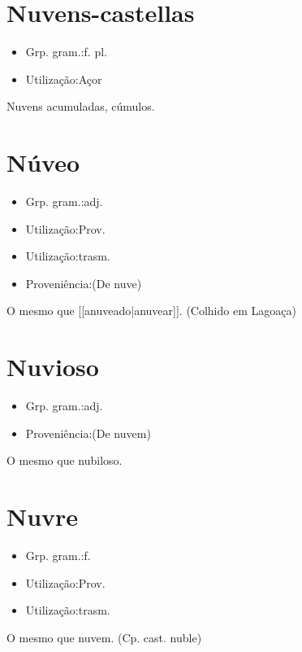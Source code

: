 \section{Nuvens-castellas}
\begin{itemize}
\item {Grp. gram.:f. pl.}
\end{itemize}
\begin{itemize}
\item {Utilização:Açor}
\end{itemize}
Nuvens acumuladas, cúmulos.
\section{Núveo}
\begin{itemize}
\item {Grp. gram.:adj.}
\end{itemize}
\begin{itemize}
\item {Utilização:Prov.}
\end{itemize}
\begin{itemize}
\item {Utilização:trasm.}
\end{itemize}
\begin{itemize}
\item {Proveniência:(De \textunderscore nuve\textunderscore )}
\end{itemize}
O mesmo que [[anuveado|anuvear]]. (Colhido em Lagoaça)
\section{Nuvioso}
\begin{itemize}
\item {Grp. gram.:adj.}
\end{itemize}
\begin{itemize}
\item {Proveniência:(De \textunderscore nuvem\textunderscore )}
\end{itemize}
O mesmo que \textunderscore nubiloso\textunderscore .
\section{Nuvre}
\begin{itemize}
\item {Grp. gram.:f.}
\end{itemize}
\begin{itemize}
\item {Utilização:Prov.}
\end{itemize}
\begin{itemize}
\item {Utilização:trasm.}
\end{itemize}
O mesmo que \textunderscore nuvem\textunderscore .
(Cp. cast. \textunderscore nuble\textunderscore )
